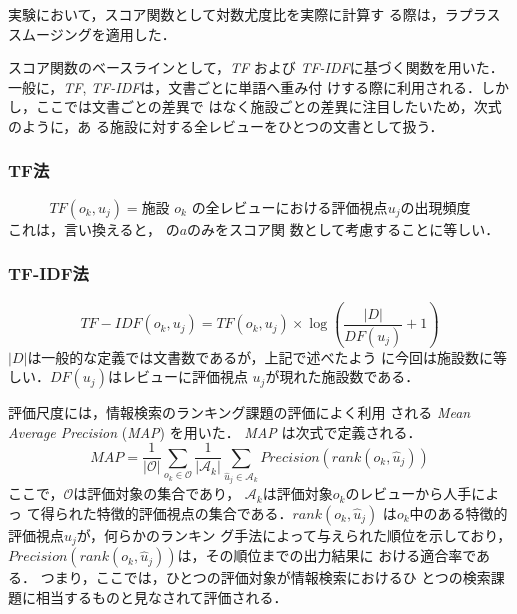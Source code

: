 \documentclass[japanese]{jnlp_1.4}
\def\tab#1{}
\begin{document}
実験において，スコア関数として対数尤度比を実際に計算す
る際は，ラプラススムージング\cite{map}を適用した．


スコア関数のベースラインとして，\textit{TF} および \textit{TF-IDF}\cite{map}に基づく関数を用いた．
一般に，\textit{TF}, \textit{TF-IDF}は，文書ごとに単語へ重み付
けする際に利用される．しかし，ここでは文書ごとの差異で
はなく施設ごとの差異に注目したいため，次式のように，あ
る施設に対する全レビューをひとつの文書として扱う．


\subsubsection{TF法}

\vspace{-1\abovedisplayskip}
\begin{equation}
\mathit{TF}(o_k, u_j) = \text{施設 $o_k$ の全レビューにおける評価視点}
u_j の出現頻度
\label{eq:tf}
\end{equation}
これは，言い換えると，\tab{kankei} の$a$のみをスコア関
数として考慮することに等しい．


\subsubsection{TF-IDF法}

\vspace{-1\abovedisplayskip}
\begin{equation}
\mathit{TF-IDF}(o_k, u_j) = \mathit{TF}(o_k,u_j) × \log ( \frac{|D|}{DF(u_j)} + 1 ) 
\label{eq:tfidf}
\end{equation}
$|D|$は一般的な定義では文書数であるが，上記で述べたよう
に今回は施設数に等しい．$DF(u_j)$はレビューに評価視点
$u_j$が現れた施設数である．

評価尺度には，情報検索のランキング課題の評価によく利用
される \textit{Mean Average Precision} (\textit{MAP}) を用いた．
\textit{MAP} は次式で定義される\cite{map}．
\begin{equation}
 \mathit{MAP} = \frac{1}{|\mathcal{O}|}\sum_{o_k \in \mathcal{O}}\frac{1}{|\mathcal{A}_k|}\sum_{\hat{u}_j \in \mathcal{A}_k}
	\mathit{Precision}(\mathit{rank}(o_k, \hat{u}_j))
\label{eq:map}
\end{equation}
ここで，$\mathcal{O}$は評価対象の集合であり，
$\mathcal{A}_k$は評価対象$o_k$のレビューから人手によっ
て得られた特徴的評価視点の集合である．$\mathit{rank}(o_k, \hat{u}_j)$
は$o_k$中のある特徴的評価視点$\hat{u}_j$が，何らかのランキン
グ手法によって与えられた順位を示しており，
$\mathit{Precision}(\mathit{rank}(o_k, \hat{u}_j))$は，その順位までの出力結果に
おける適合率である．
つまり，ここでは，ひとつの評価対象が情報検索におけるひ
とつの検索課題に相当するものと見なされて評価される．
\end{document}
